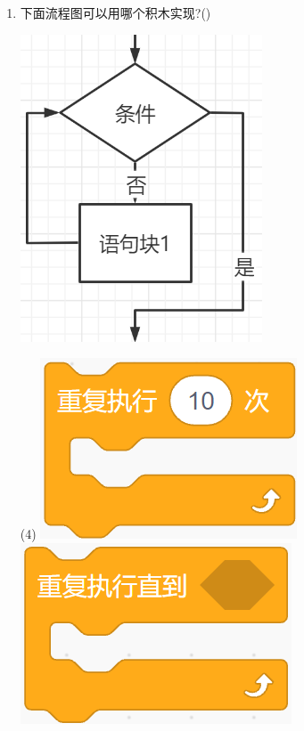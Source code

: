 \documentclass[10pt, a4paper]{article}
\begin{document}
\begin{enumerate}
        \item 下面流程图可以用哪个积木实现?(\qquad)
        
        \begin{minipage}{.11\textwidth}
            \centering
            \includegraphics[width=\textwidth]{23.png}
        \end{minipage}
        \begin{minipage}{.78\textwidth}
            \begin{tasks}(4)
                \task \includegraphics[width=.18\textwidth]{23a.png}
                \task \includegraphics[width=.18\textwidth]{23b.png}

\end{tasks}
\end{minipage}
\end{enumerate}
\end{document}

